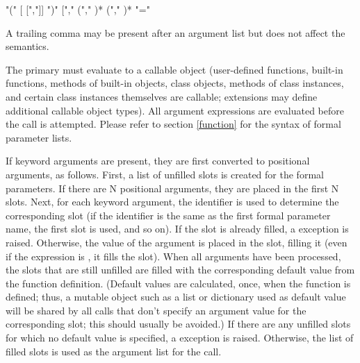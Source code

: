 \begin{productionlist}
             { "(" [ [","]] ")"}
             { ["," }
  \productioncont{   ["," "*" \token{expression} ["," "**" \token{expression}]]]}
  \productioncont{| \token{keyword_arguments} ["," "*" \token{expression}}
  \productioncont{                             ["," "**" \token{expression}]]}
             { ("," )*}
             { ("," )*}
             { "=" }
\end{productionlist}

A trailing comma may be present after an argument list but does not
affect the semantics.

The primary must evaluate to a callable object (user-defined
functions, built-in functions, methods of built-in objects, class
objects, methods of class instances, and certain class instances
themselves are callable; extensions may define additional callable
object types).  All argument expressions are evaluated before the call
is attempted.  Please refer to section \ref{function} for the syntax
of formal parameter lists.

If keyword arguments are present, they are first converted to
positional arguments, as follows.  First, a list of unfilled slots is
created for the formal parameters.  If there are N positional
arguments, they are placed in the first N slots.  Next, for each
keyword argument, the identifier is used to determine the
corresponding slot (if the identifier is the same as the first formal
parameter name, the first slot is used, and so on).  If the slot is
already filled, a  exception is raised.
Otherwise, the value of the argument is placed in the slot, filling it
(even if the expression is , it fills the slot).  When all
arguments have been processed, the slots that are still unfilled are
filled with the corresponding default value from the function
definition.  (Default values are calculated, once, when the function
is defined; thus, a mutable object such as a list or dictionary used
as default value will be shared by all calls that don't specify an
argument value for the corresponding slot; this should usually be
avoided.)  If there are any unfilled slots for which no default value
is specified, a  exception is raised.  Otherwise,
the list of filled slots is used as the argument list for the call.

